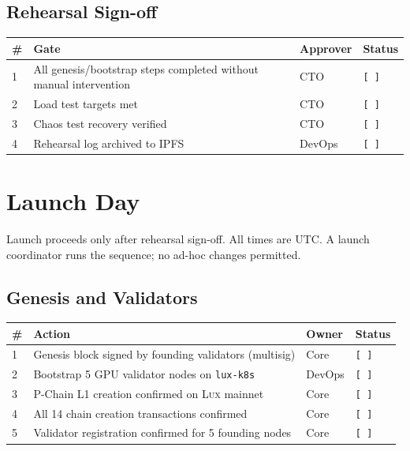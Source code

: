 \documentclass[11pt,letterpaper]{article}
\newcommand{\pending}{\texttt{[ ]}}
\newcommand{\Lux}{\textsc{Lux}}
\begin{document}
\subsection{Rehearsal Sign-off}

\begin{tabularx}{\textwidth}{@{}l X l l@{}}
\toprule
\textbf{\#} & \textbf{Gate} & \textbf{Approver} & \textbf{Status} \\
\midrule
1 & All genesis/bootstrap steps completed without manual intervention & CTO    & \pending \\
2 & Load test targets met                                             & CTO    & \pending \\
3 & Chaos test recovery verified                                      & CTO    & \pending \\
4 & Rehearsal log archived to IPFS                                    & DevOps & \pending \\
\bottomrule
\end{tabularx}

\section{Launch Day}

Launch proceeds only after rehearsal sign-off. All times are UTC.
A launch coordinator runs the sequence; no ad-hoc changes permitted.

\subsection{Genesis and Validators}

\begin{tabularx}{\textwidth}{@{}l X l l@{}}
\toprule
\textbf{\#} & \textbf{Action} & \textbf{Owner} & \textbf{Status} \\
\midrule
1 & Genesis block signed by founding validators (multisig)       & Core   & \pending \\
2 & Bootstrap 5 GPU validator nodes on \texttt{lux-k8s}          & DevOps & \pending \\
3 & P-Chain L1 creation confirmed on \Lux{} mainnet              & Core   & \pending \\
4 & All 14 chain creation transactions confirmed                 & Core   & \pending \\
5 & Validator registration confirmed for 5 founding nodes        & Core   & \pending \\
\bottomrule
\end{tabularx}
\end{document}
